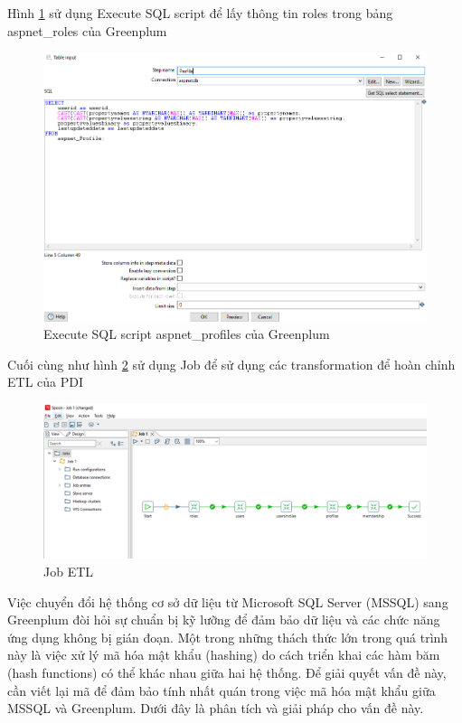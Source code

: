 \documentclass[14pt]{article}
\begin{document}
Hình \ref{fig:gprofiles} sử dụng Execute SQL script để lấy thông tin roles trong bảng aspnet\_roles của Greenplum


\begin{figure}
    \centering
    \includegraphics[width=0.5\linewidth]{images/gprofiles.png}
    \caption{Execute SQL script aspnet\_profiles của Greenplum}
    \label{fig:gprofiles}
\end{figure}


Cuối cùng như hình \ref{fig:job} sử dụng Job để sử dụng các transformation để hoàn chỉnh ETL của PDI


\begin{figure}
    \centering
    \includegraphics[width=0.5\linewidth]{images/job.png}
    \caption{Job ETL}
    \label{fig:job}
\end{figure}

Việc chuyển đổi hệ thống cơ sở dữ liệu từ Microsoft SQL Server (MSSQL) sang Greenplum đòi hỏi sự chuẩn bị kỹ lưỡng để đảm bảo dữ liệu và các chức năng ứng dụng không bị gián đoạn. Một trong những thách thức lớn trong quá trình này là việc xử lý mã hóa mật khẩu (hashing) do cách triển khai các hàm băm (hash functions) có thể khác nhau giữa hai hệ thống. Để giải quyết vấn đề này, cần viết lại mã để đảm bảo tính nhất quán trong việc mã hóa mật khẩu giữa MSSQL và Greenplum. Dưới đây là phân tích và giải pháp cho vấn đề này.
\end{document}
